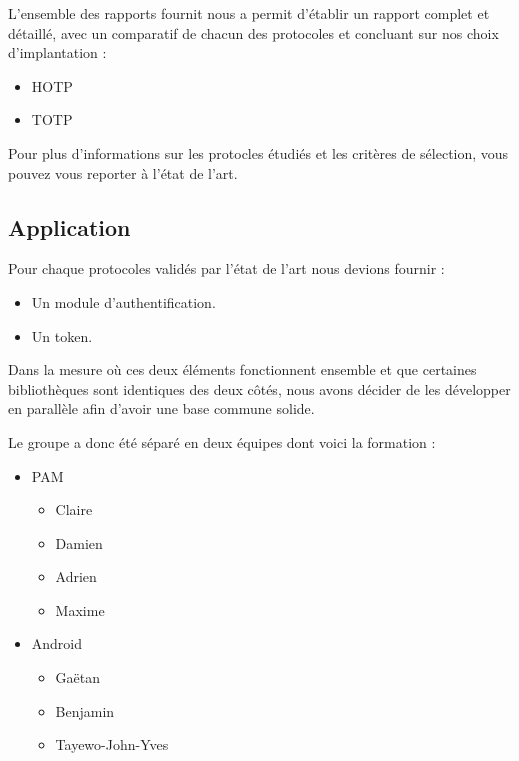     L'ensemble des rapports fournit nous a permit d'établir un rapport complet
    et détaillé, avec un comparatif de chacun des protocoles et concluant sur
    nos choix d'implantation :

    \begin{itemize}
      \item HOTP
      \item TOTP
    \end{itemize}

    Pour plus d'informations sur les protocles étudiés et les critères de
    sélection, vous pouvez vous reporter à l'état de l'art.


  \subsection{Application}

      Pour chaque protocoles validés par l'état de l'art nous devions fournir :

      \begin{itemize}
        \item Un module d'authentification.
        \item Un token.
      \end{itemize}

      Dans la mesure où ces deux éléments fonctionnent ensemble et que
      certaines bibliothèques sont identiques des deux côtés, nous avons
      décider de les développer en parallèle afin d'avoir une base commune
      solide.

      Le groupe a donc été séparé en deux équipes dont voici la formation :

      \begin{itemize}
        \item PAM
        \begin{itemize}
          \item Claire 
          \item Damien 
          \item Adrien 
          \item Maxime 
        \end{itemize}
        \item Android
        \begin{itemize}
          \item Gaëtan 
          \item Benjamin 
          \item Tayewo-John-Yves 
        \end{itemize}
      \end{itemize}



